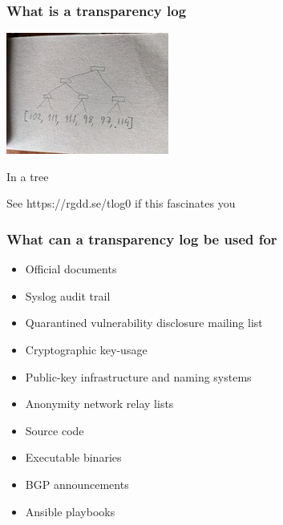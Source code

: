 \begin{frame}
  \frametitle{What is a transparency log}
  \centerline{\includegraphics{img/tree6_s}}
  \centerline{In a tree}
  \pause
  \centerline{See https://rgdd.se/tlog0 if this fascinates you}
\end{frame}

\begin{frame}
  \frametitle{What can a transparency log be used for}

  \begin{itemize}
  \item Official documents
  \item Syslog audit trail
  \item Quarantined vulnerability disclosure mailing list
  \item Cryptographic key-usage
  \item Public-key infrastructure and naming systems
  \item Anonymity network relay lists
  \item Source code
  \item Executable binaries
  \item BGP announcements
  \item Ansible playbooks
  \end{itemize}

\end{frame}

